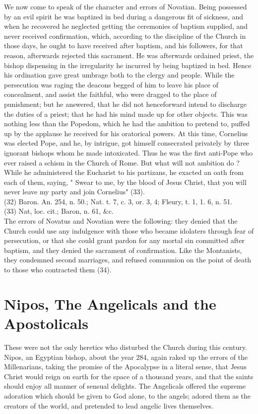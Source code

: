 \documentclass[12pt]{book}
\begin{document}
We now come to speak of the character and errors of Novatian. Being possessed by an evil spirit he was
baptized in bed during a dangerous fit of sickness, and when he recovered he neglected getting the
ceremonies of baptism supplied, and never received confirmation, which, according to the discipline of
the Church in those days, he ought to have received after baptism, and his followers, for that reason,
afterwards rejected this sacrament. He was afterwards ordained priest, the bishop dispensing in the
irregularity he incurred by being baptized in bed. Hence his ordination gave great umbrage both to the
clergy and people. While the persecution was raging the deacons begged of him to leave his place of
concealment, and assist the faithful, who were dragged to the place of punishment; but he answered, that
he did not henceforward intend to discharge the duties of a priest; that he had his mind made up for
other objects. This was nothing less than the Popedom, which he had the ambition to pretend to, puffed
up by the applause he received for his oratorical powers. At this time, Cornelius was elected Pope, and
he, by intrigue, got himself consecrated privately by three ignorant bishops whom he made intoxicated.
Thus he was the first anti-Pope who ever raised a schism in the Church of Rome. But what will not
ambition do ? While he administered the Eucharist to his partizans, he exacted an oath from each of them,
saying, " Swear to me, by the blood of Jesus Christ, that you will never leave my party and join Cornelius"
(33). \\
(32) Baron. An. 254, n. 50.; Nat. t. 7, c. 3, or. 3, 4; Fleury, t. 1, 1. 6, n. 51. \\
(33) Nat, loc. cit.; Baron, n. 61, \&c. \\

The errors of Novatus and Novatian were the following: they denied that the Church could use any
indulgence with those who became idolaters through fear of persecution, or that she could grant pardon
for any mortal sin committed after baptism, and they denied the sacrament of confirmation. Like the
Montanists, they condemned second marriages, and refused communion on the point of death to those
who contracted them (34).
\section{Nipos, The Angelicals and the Apostolicals}
These were not the only heretics who disturbed the Church during this century. Nipos, an Egyptian
bishop, about the year 284, again raked up the errors of the Millenarians, taking the promise of the
Apocalypse in a literal sense, that Jesus Christ would reign on earth for the space of a thousand years,
and that the saints should enjoy all manner of sensual delights. The Angelicals offered the supreme
adoration which should be given to God alone, to the angels; adored them as the creators of the world,
and pretended to lead angelic lives themselves.
\end{document}
